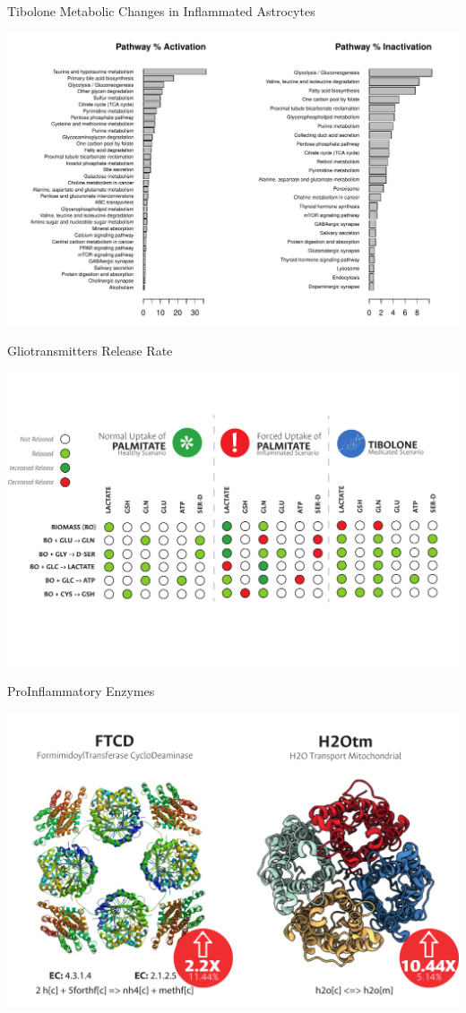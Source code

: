 \documentclass[11pt]{beamer}
\begin{document}
\begin{frame}{Tibolone Metabolic Changes in Inflammated Astrocytes}
\begin{center}
\includegraphics[width=\textwidth]{Inflammated2Tibolone}
\end{center}
\end{frame}
\begin{frame}{Gliotransmitters Release Rate}
\begin{center}
\includegraphics[width=\textwidth]{GTt}
\end{center}
\end{frame}
\begin{frame}{ProInflammatory Enzymes}
\begin{center}
\includegraphics[width=\textwidth]{ProInflammatory}
\end{center}
\end{frame}
\end{document}
